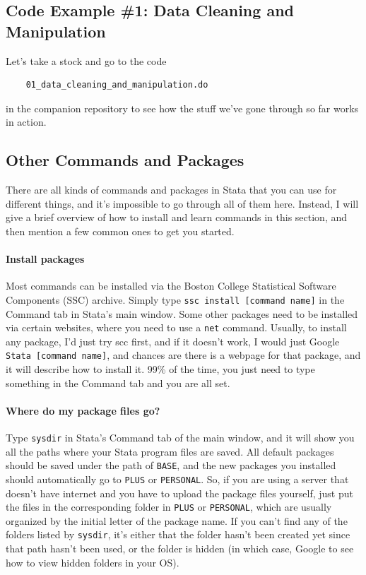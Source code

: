 \subsection{Code Example \#1: Data Cleaning and Manipulation}
Let's take a stock and go to the code 
\begin{verbatim}
    01_data_cleaning_and_manipulation.do
\end{verbatim}
in the companion repository to see how the stuff we've gone through so far works in action. 

\subsection{Other Commands and Packages}
There are all kinds of commands and packages in Stata that you can use for different things, and it's impossible to go through all of them here. Instead, I will give a brief overview of how to install and learn commands in this section, and then mention a few common ones to get you started. 

\paragraph{Install packages} Most commands can be installed via the Boston College Statistical Software Components (SSC) archive. Simply type \verb|ssc install [command name]| in the Command tab in Stata's main window. Some other packages need to be installed via certain websites, where you need to use a \verb|net| command. Usually, to install any package, I'd just try scc first, and if it doesn't work, I would just Google \verb|Stata [command name]|, and chances are there is a webpage for that package, and it will describe how to install it. 99\% of the time, you just need to type something in the Command tab and you are all set. 

\paragraph{Where do my package files go?} Type \verb|sysdir| in Stata's Command tab of the main window, and it will show you all the paths where your Stata program files are saved. All default packages should be saved under the path of \verb|BASE|, and the new packages you installed should automatically go to \verb|PLUS| or \verb|PERSONAL|. So, if you are using a server that doesn't have internet and you have to upload the package files yourself, just put the files in the corresponding folder in \verb|PLUS| or \verb|PERSONAL|, which are usually organized by the initial letter of the package name. If you can't find any of the folders listed by \verb|sysdir|, it's either that the folder hasn't been created yet since that path hasn't been used, or the folder is hidden (in which case, Google to see how to view hidden folders in your OS). 

